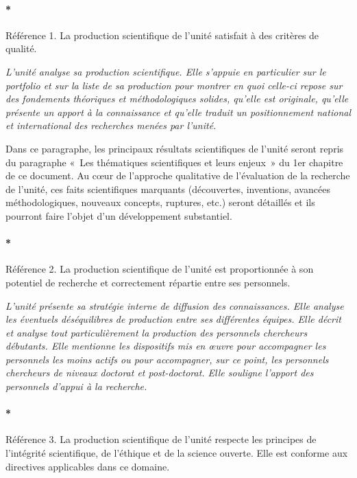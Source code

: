 \documentclass[]{article}
\let\oldparagraph\paragraph
\renewcommand{\paragraph}[1]{\oldparagraph{#1}\mbox{}}
\newcommand{\instructions}[1]{{\em \color{hceresgreen}#1}}
\begin{document}
\paragraph*{Référence 1. La production scientifique de l'unité satisfait
à des critères de qualité.}

\instructions{L’unité analyse sa production scientifique. Elle s’appuie en particulier sur le portfolio et sur la liste de sa production pour montrer en quoi celle-ci repose sur des fondements théoriques et méthodologiques solides, qu’elle est originale, qu’elle présente un apport à la connaissance et qu’elle traduit un positionnement national et international des recherches menées par l’unité. 

Dans ce paragraphe, les principaux résultats scientifiques de l’unité seront repris du paragraphe « Les thématiques scientifiques et leurs enjeux » du 1er chapitre de ce document. Au cœur de l’approche qualitative de l’évaluation de la recherche de l’unité, ces faits scientifiques marquants (découvertes, inventions, avancées méthodologiques, nouveaux concepts, ruptures, etc.) seront détaillés et ils pourront faire l’objet d’un développement substantiel.}

\paragraph*{Référence 2. La production scientifique de l'unité est
proportionnée à son potentiel de recherche et correctement répartie
entre ses personnels.}

\instructions{L’unité présente sa stratégie interne de diffusion des connaissances. Elle analyse les éventuels déséquilibres de production entre ses différentes équipes. Elle décrit et analyse tout particulièrement la production des personnels chercheurs débutants. Elle mentionne les dispositifs mis en œuvre pour accompagner les personnels les moins actifs ou pour accompagner, sur ce point, les personnels chercheurs de niveaux doctorat et post-doctorat. Elle souligne l’apport des personnels d’appui à la recherche.}

\paragraph*{Référence 3. La production scientifique de l'unité respecte
les principes de l'intégrité scientifique, de l'éthique et de la science
ouverte. Elle est conforme aux directives applicables dans ce domaine.}
\end{document}
